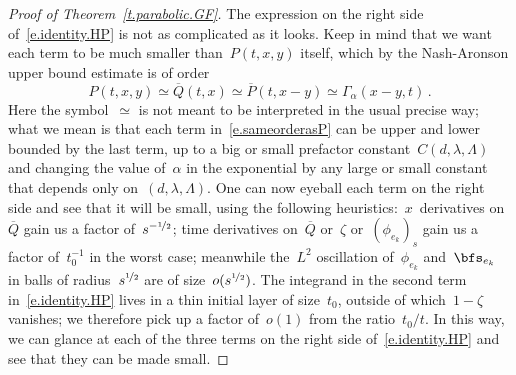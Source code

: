 \documentclass[11pt,twoside]{article} %
\numberwithin{equation}{section}
\theoremstyle{definition}
\newcommand*{\Rd}{\ensuremath{\mathbb{R}^d}}
\begin{document}
\begin{proof}[{Proof of Theorem~\ref{t.parabolic.GF}}]
The expression on the right side of~\eqref{e.identity.HP} is not as complicated as it looks. Keep in mind that we want each term to be much smaller than~$P(t,x,y)$ itself, which by the Nash-Aronson upper bound estimate is of order 
\begin{equation}
\label{e.sameorderasP}
P(t,x,y) \simeq \overline{Q}(t,x) \simeq \overline{P}(t,x-y) 
\simeq \Gamma_\alpha(x-y,t)
\,.
\end{equation}
Here the symbol~$\simeq$ is not meant to be interpreted in the usual precise way; what we mean is that each term in~\eqref{e.sameorderasP} can be upper and lower bounded by the last term, up to a big or small prefactor constant~$C(d,\lambda,\Lambda)$ and changing the value of~$\alpha$ in the exponential by any large or small constant that depends only on~$(d,\lambda,\Lambda)$. 
One can now eyeball each term on the right side and see that it will be small, using the following heuristics:~$x$~derivatives on~$\overline{Q}$ gain us a factor of~$s^{-\nicefrac12}$; time derivatives on~$\overline{Q}$ or~$\zeta$ or~$( \phi_{e_k})_s$ gain us a factor of~$t_0^{-1}$ in the worst case; meanwhile the~$L^2$ oscillation of~$\phi_{e_k}$ and~$\bfs_{e_k}$ in balls of radius~$s^{\nicefrac12}$ are of size~$o(s^{\nicefrac12})$. The integrand in the second term in~\eqref{e.identity.HP} lives in a thin initial layer of size~$t_0$, outside of which~$1-\zeta$ vanishes; we therefore pick up a factor of~$o(1)$ from the ratio~$t_0/t$. In this way, we can glance at each of the three terms on the right side of~\eqref{e.identity.HP} and see that they can be made small. 

\smallskip


\end{proof}
\end{document}
